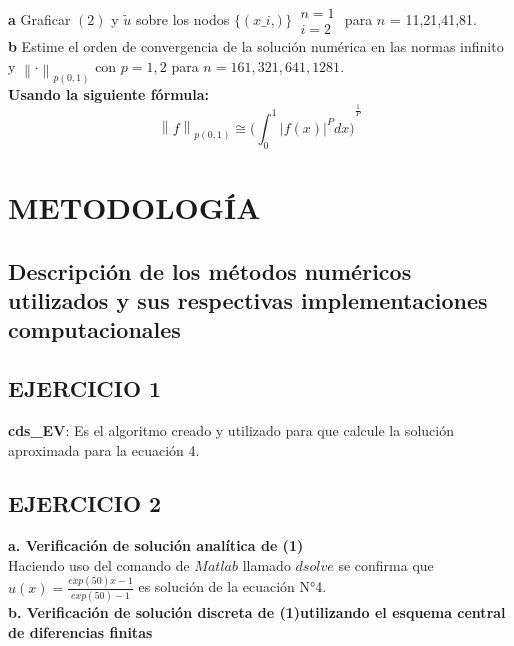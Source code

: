 \documentclass[paper=a4, parskip=full, fontsize=12pt]{scrartcl} %
\numberwithin{equation}{section} %
\numberwithin{figure}{section} %
\numberwithin{table}{section} %
\begin{document}
\textbf{a} Graficar $(2)$ y $\tilde { u }$ sobre los nodos  $\{ \left( x\_ i,) \right\} \begin{matrix} n=1 \\ i=2 \end{matrix}$ para $n$ = 11,21,41,81. \\
\textbf{b} Estime el orden de convergencia de la soluci\'on num\'erica en las normas infinito y ${ \left\| \cdot  \right\|  }_{ p(0,1) }$ con $p=1,2$ para $n=161,321,641,1281$.\\

\textbf{Usando la siguiente f\'ormula:}
\begin{equation}
{ \left\| f \right\|  }_{ p(0,1) }\cong { (\int _{ 0 }^{ 1 }{ { \left| f(x) \right|  }^{ P }dx) }  }^{ \frac { 1 }{ P }  }
\end{equation}

\section{METODOLOG\'IA}

\subsection{Descripci\'on de los m\'etodos num\'ericos utilizados y sus respectivas implementaciones computacionales}

\subsection*{EJERCICIO 1}

\textbf{cds\_EV}: Es el algoritmo creado y utilizado para que calcule la soluci\'on aproximada para la ecuaci\'on 4.\\

\subsection*{EJERCICIO 2}
\textbf{a. Verificaci\'on de soluci\'on anal\'itica de (1)}\\

Haciendo uso del comando de $Matlab$ llamado $dsolve$ se confirma que $u(x)=\frac { exp(50)x -1}{ exp(50)-1}$ es soluci\'on de la ecuaci\'on N°4.\\

\textbf{b. Verificaci\'on de soluci\'on discreta de (1)utilizando el esquema central de diferencias finitas}\\
\end{document}
